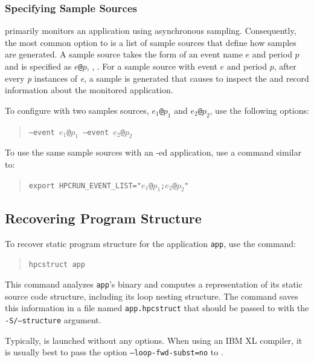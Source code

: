 \documentclass[11pt,letterpaper]{report}
\begin{document}
\subsubsection{Specifying Sample Sources}

\HPCToolkit{} primarily monitors an application using asynchronous sampling.
Consequently, the most common option to \hpcrun{} is a list of sample sources that define how samples are generated.
A sample source takes the form of an event name $e$ and period $p$ and is specified as \texttt{$e$@$p$}, \eg{}, .
For a sample source with event $e$ and period $p$, after every \emph{p} instances of \emph{e}, a sample is generated that causes \hpcrun{} to inspect the and record information about the monitored application.

To configure \hpcrun{} with two samples sources, \texttt{$e_1$@$p_1$} and \texttt{$e_2$@$p_2$}, use the following options:
\begin{quote}
  \texttt{--event $e_1$@$p_1$ --event $e_2$@$p_2$}
\end{quote}
To use the same sample sources with an \hpclink{}-ed application, use a command similar to:
\begin{quote}
  \texttt{export HPCRUN\_EVENT\_LIST="$e_1$@$p_1$;$e_2$@$p_2$"}
\end{quote}



\subsection{Recovering Program Structure}

To recover static program structure for the application \texttt{app}, use the command:
\begin{quote}
  \verb|hpcstruct app|
\end{quote}
This command analyzes \texttt{app}'s binary and computes a representation of its static source code structure, including its loop nesting structure.
The command saves this information in a file named \texttt{app.hpcstruct} that should be passed to \hpcprof{} with the \texttt{-S/--structure} argument.

Typically, \hpcstruct{} is launched without any options.
When using an IBM XL compiler, it is usually best to pass the option \texttt{--loop-fwd-subst=no} to \hpcstruct{}.


\end{document}
